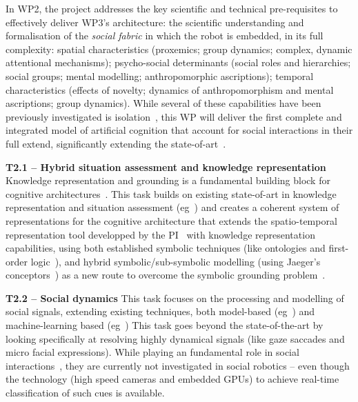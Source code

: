 \documentclass[11pt,a4paper]{report}
\begin{document}
In WP2, the project addresses the key scientific and technical pre-requisites to
effectively deliver WP3's architecture:  the scientific understanding and
formalisation of the \emph{social fabric} in which the robot is embedded, in its
full complexity: spatial characteristics (proxemics; group dynamics; complex,
dynamic attentional mechanisms); psycho-social determinants (social roles and
hierarchies; social groups; mental modelling; anthropomorphic ascriptions);
temporal characteristics (effects of novelty; dynamics of anthropomorphism and
mental ascriptions; group dynamics).  While several of these capabilities have
been previously investigated is isolation~\cite{lemaignan2014dynamics,
flook2019impact,lemaignan2015youre, fink2014which, ros2010which,
warnier2012when, lemaignan2015mutual, dillenbourg2016symmetry,
winkle2019effective}, this WP will deliver the first complete and integrated
model of artificial cognition that account for social interactions in their full
extend, significantly extending the state-of-art~\cite{lemaignan2017artificial,
baxter2016cognitive}.


\textbf{T2.1 -- Hybrid situation assessment and knowledge representation}
Knowledge representation and grounding is a fundamental building block for
cognitive architectures~\cite{lemaignan2017artificial,beetz2010cram}. This task
builds on existing state-of-art in knowledge representation and situation
assessment (eg~\cite{citeneeded}) and creates a coherent system of
representations for the cognitive architecture that extends the 
spatio-temporal representation tool developped by the
PI~\cite{lemaignan2018underworlds,sallami2019simulation} with knowledge
representation capabilities, using both established symbolic techniques (like
ontologies and first-order logic~\cite{lemaignan2010oro, tenorth2009knowrob}),
and hybrid symbolic/sub-symbolic modelling (using Jaeger's
conceptors~\cite{jaeger2014controlling}) as a new route to overcome the symbolic
grounding problem~\cite{harnad1990symbol}.

\textbf{T2.2 -- Social dynamics} This task focuses on the processing and
modelling of social signals, extending existing techniques, both model-based
(eg~\cite{lemaignan2016realtime,others}) and machine-learning based
(eg~\cite{chetouani,others}) This task goes beyond the state-of-the-art by
looking specifically at resolving highly dynamical signals (like gaze saccades
and micro facial expressions). While playing an fundamental role in social
interactions~\cite{citeneeded}, they are currently not investigated in social
robotics -- even though the technology (high speed cameras and embedded GPUs) to
achieve real-time classification of such cues is available.
\end{document}
